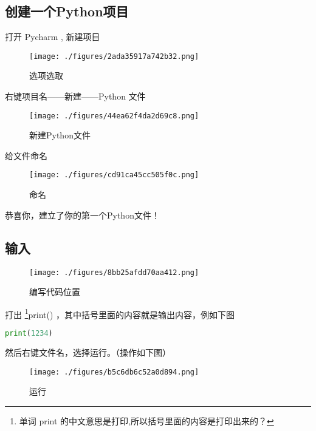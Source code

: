 

\begin{issues}
\issueTODO
\end{issues}

\subsection{创建一个Python项目}

打开 Pycharm , 新建项目

\begin{figure}[ht]
\centering
\texttt{[image: ./figures/2ada35917a742b32.png]}
\caption{选项选取} \label{fig_Pyc2_2}
\end{figure}

右键项目名——新建——Python 文件

\begin{figure}[ht]
\centering
\texttt{[image: ./figures/44ea62f4da2d69c8.png]}
\caption{新建Python文件} \label{fig_Pyc2_1}
\end{figure}

给文件命名

\begin{figure}[ht]
\centering
\texttt{[image: ./figures/cd91ca45cc505f0c.png]}
\caption{命名} \label{fig_Pyc2_3}
\end{figure}

恭喜你，建立了你的第一个Python文件！

\subsection{输入}

\begin{figure}[ht]
\centering
\texttt{[image: ./figures/8bb25afdd70aa412.png]}
\caption{编写代码位置} \label{fig_Pyc2_4}
\end{figure}

打出 \footnote{单词 print 的中文意思是打印,所以括号里面的内容是打印出来的？}print() ，其中括号里面的内容就是输出内容，例如下图

\begin{lstlisting}[language=python]
print(1234)
\end{lstlisting}

然后右键文件名，选择运行。（操作如下图）

\begin{figure}[ht]
\centering
\texttt{[image: ./figures/b5c6db6c52a0d894.png]}
\caption{运行} \label{fig_Pyc2_5}
\end{figure}


